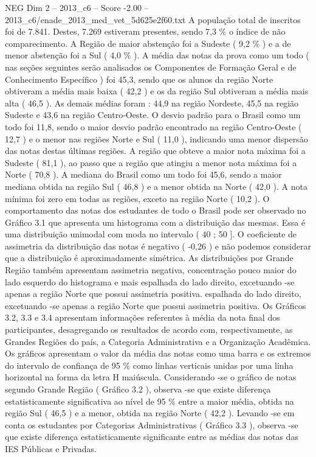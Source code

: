 \begin{textsample}{NEG Dim 2 – 2013\_c6 – Score -2.00 – 2013\_c6/enade\_2013\_med\_vet\_5d625e2f60.txt}
A população total de inscritos foi de 7.841.
Destes, 7.269 estiveram presentes, sendo 7,3 \% o índice de não comparecimento.
A Região de maior abstenção foi a Sudeste ( 9,2 \% ) e a de menor abstenção foi a Sul ( 4,0 \% ).
A média das notas da prova como um todo ( nas seções seguintes serão analisados os Componentes de Formação Geral e de Conhecimento Específico ) foi 45,3, sendo que os alunos da região Norte obtiveram a média mais baixa ( 42,2 ) e os da região Sul obtiveram a média mais alta ( 46,5 ).
As demais médias foram : 44,9 na região Nordeste, 45,5 na região Sudeste e 43,6 na região Centro-Oeste.
O desvio padrão para o Brasil como um todo foi 11,8, sendo o maior desvio padrão encontrado na região Centro-Oeste ( 12,7 ) e o menor nas regiões Norte e Sul ( 11,0 ), indicando uma menor dispersão das notas destas últimas regiões.
A região que obteve a maior nota máxima foi a Sudeste ( 81,1 ), ao passo que a região que atingiu a menor nota máxima foi a Norte ( 70,8 ).
A mediana do Brasil como um todo foi 45,6, sendo a maior mediana obtida na região Sul ( 46,8 ) e a menor obtida na Norte ( 42,0 ).
A nota mínima foi zero em todas as regiões, exceto na região Norte ( 10,2 ).
O comportamento das notas dos estudantes de todo o Brasil pode ser observado no Gráfico 3.1 que apresenta um histograma com a distribuição das mesmas.
Essa é uma distribuição unimodal com moda no intervalo ( 40 ; 50 ].
O coeficiente de assimetria da distribuição das notas é negativo ( -0,26 ) e não podemos considerar que a distribuição é aproximadamente simétrica.
As distribuições por Grande Região também apresentam assimetria negativa, concentração pouco maior do lado esquerdo do histograma e mais espalhada do lado direito, excetuando -se apenas a região Norte que possui assimetria positiva. espalhada do lado direito, excetuando -se apenas a região Norte que possui assimetria positiva.
Os Gráficos 3.2, 3.3 e 3.4 apresentam informações referentes à média da nota final dos participantes, desagregando os resultados de acordo com, respectivamente, as Grandes Regiões do país, a Categoria Administrativa e a Organização Acadêmica.
Os gráficos apresentam o valor da média das notas como uma barra e os extremos do intervalo de confiança de 95 \% como linhas verticais unidas por uma linha horizontal na forma da letra H maiúscula.
Considerando -se o gráfico de notas segundo Grande Região ( Gráfico 3.2 ), observa -se que existe diferença estatisticamente significativa ao nível de 95 \% entre a maior média, obtida na região Sul ( 46,5 ) e a menor, obtida na região Norte ( 42,2 ).
Levando -se em conta os estudantes por Categorias Administrativas ( Gráfico 3.3 ), observa -se que existe diferença estatisticamente significante entre as médias das notas das IES Públicas e Privadas.

\end{textsample}
